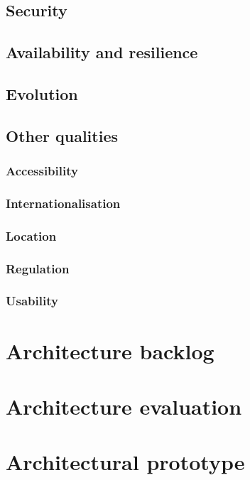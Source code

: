 \documentclass[a4paper,11pt]{report}
\begin{document}
\section{Security}
\label{sec:security}



\section{Availability and resilience}
\label{sec:avail-resil}



\section{Evolution}
\label{sec:evolution}


\section{Other qualities}
\label{sec:other-qualities}

\subsection{Accessibility}
\label{sec:accessibility}


\subsection{Internationalisation}
\label{sec:internationalisation}


\subsection{Location}
\label{sec:location}


\subsection{Regulation}
\label{sec:regulation}


\subsection{Usability}
\label{sec:usability}


\appendix

\chapter{Architecture backlog}
\label{cha:architecture-backlog}
\thispagestyle{fancy}


\chapter{Architecture evaluation}
\label{cha:arch-eval}
\thispagestyle{fancy}


\chapter{Architectural prototype}
\label{cha:arch-prot}
\thispagestyle{fancy}





%
%


\end{document}
